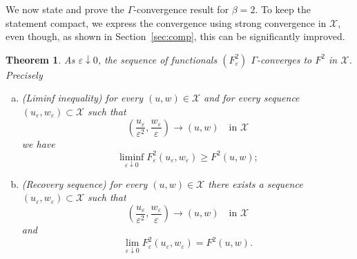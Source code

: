 \documentclass[a4, 11pt, reqno, final]{amsart}
\newcommand{\calX}{\mathcal{X}}
\newcommand\e{\varepsilon}
\theoremstyle{plain}%
\newtheorem{theorem}{Theorem}[section]
\begin{document}
	We now state and prove the $\Gamma$-convergence result for $\beta = 2$. To keep the statement compact, we express the convergence using strong convergence in $\mathcal{X}$, even though, as shown in Section~\ref{sec:comp}, this can be significantly improved.



	\begin{theorem}\label{thm:gc3}
		As $\e\downarrow 0$, the sequence of functionals $(F_{\e}^{2})$ $\Gamma$-converges to $F^{2}$ in $\calX$. Precisely
		\begin{enumerate}[(a)]
			\item (Liminf inequality) for every $(u,w)\in \calX$ and for every sequence $(u_\e, w_\e)\subset \calX$ such that
			$$
			(\frac{u_\e}{\e^2},\frac{w_\e}\e)\to (u,w)\quad \mbox{in }\calX
			$$
			we have
			\begin{equation*}
				\liminf\limits_{\e\downarrow 0} F_{\e}^{2}(u_\e, w_\e)\geq F^{2}(u,w);
			\end{equation*}
			\item (Recovery sequence)
			for every  $(u,w)\in \calX$ there exists a sequence $(u_\e, w_\e)\subset \calX$ such that
			$$
			(\frac{u_\e}{\e^2},\frac{w_\e}\e)\to (u,w)\quad \mbox{in }\calX
			$$
			and
			\begin{equation*}
				\lim\limits_{\e\downarrow 0} F_{\e}^{2}(u_\e, w_\e) = F^{2}(u,w).
			\end{equation*}
		\end{enumerate}
	\end{theorem}
\end{document}
